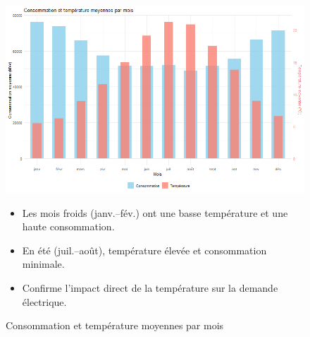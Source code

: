 \documentclass[12pt,a4paper]{article}
\begin{document}
\begin{figure}[H]
  \centering
  \begin{minipage}[t]{0.48\textwidth}
    \centering
    \includegraphics[width=\linewidth]{Projet_partie_A/conso_temp_moyennes_par_mois_superpose.png}
    \caption{Consommation et température moyennes par mois}
    \label{fig:conso_temp_mois}
  \end{minipage}
  \hfill
  \begin{minipage}[t]{0.48\textwidth}
    \small
    \begin{itemize}
      \item Les mois froids (janv.–fév.) ont une basse température et une haute consommation.  
      \item En été (juil.–août), température élevée et consommation minimale.  
      \item Confirme l’impact direct de la température sur la demande électrique.  
    \end{itemize}
  \end{minipage}
\end{figure}
\end{document}
